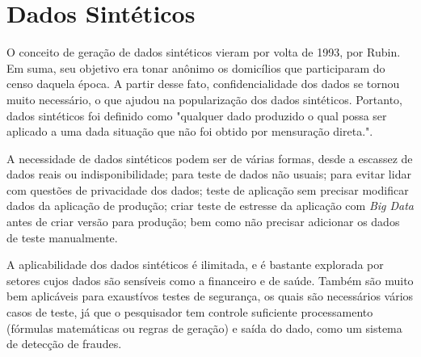 \documentclass[
	12pt,				%
	openright,			%
	twoside,			%
	a4paper,			%
	english,			%
	brazil				%
	]{abntex2}
\begin{document}

	\section{Dados Sintéticos}
	O conceito de geração de dados sintéticos vieram por volta de 1993, por Rubin. \cite{rubin1993statistical}
	Em suma, seu objetivo era tonar anônimo os domicílios que participaram do censo daquela época.
	A partir desse fato, confidencialidade dos dados se tornou muito necessário, o que ajudou na popularização dos dados sintéticos.
	Portanto, dados sintéticos foi definido como "qualquer dado produzido o qual possa ser aplicado a uma dada situação que não foi obtido por mensuração direta.". \cite{mcgraw-hilleducation2016}
	\par
	A necessidade de dados sintéticos podem ser de várias formas, 
	desde a escassez de dados reais ou indisponibilidade;
	 para teste de dados não usuais;
	 para evitar lidar com questões de privacidade dos dados;
	 teste de aplicação sem precisar modificar dados da aplicação de produção;
	 criar teste de estresse da aplicação com \emph{Big Data} antes de criar versão para produção;
	 bem como não precisar adicionar os dados de teste manualmente. \cite{top15DatagenTools2019}
	\par
	A aplicabilidade dos dados sintéticos é ilimitada, e é bastante explorada por setores cujos dados são sensíveis como a financeiro \cite{lopez2012money} e de saúde. \cite{bergeat2014french} 	
	Também são muito bem aplicáveis para exaustívos testes de segurança, os quais são necessários vários casos de teste, já que o pesquisador tem controle suficiente processamento (fórmulas matemáticas ou regras de geração) e saída do dado, como um sistema de detecção de fraudes. \cite{barse2003synthesizing}
	 
\end{document}
